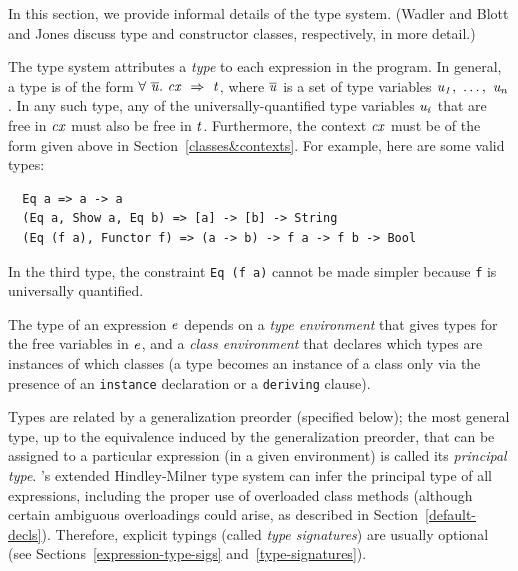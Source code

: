 In this section, we provide informal details of the type system.
(Wadler and Blott \cite{wadler:classes} and Jones
\cite{jones:cclasses} discuss type
and constructor classes, respectively, in more detail.)


The \Haskell{} type system attributes a {\em type} to each
expression in the program.  In general, a type is of the form
\mbox{$\it \forall\ \overline{u}.~cx\ \Rightarrow\ t$},
where \mbox{$\it \overline{u}$} is a set of type variables \mbox{$\it u_1,\ \ldots ,\ u_n$}.
In any such type, any of the universally-quantified type variables \mbox{$\it u_i$}
that are free in \mbox{$\it cx$} must also be free in \mbox{$\it t$}.
Furthermore, the context \mbox{$\it cx$} must be of the form given above in
Section~\ref{classes&contexts}.  For example, here are some
valid types:
\bprog
{\small\begin{verbatim}
  Eq a => a -> a
  (Eq a, Show a, Eq b) => [a] -> [b] -> String
  (Eq (f a), Functor f) => (a -> b) -> f a -> f b -> Bool
\end{verbatim}}
\eprog
In the third type, the constraint \mbox{\tt Eq\ (f\ a)} cannot be made
simpler because \mbox{\tt f} is universally quantified.

The type of an expression \mbox{$\it e$} depends 
on a {\em type environment} that gives types 
for the free variables in \mbox{$\it e$}, and a
{\em class environment} that 
declares which types are instances of which classes (a type becomes
an instance of a class only via the presence of an
\mbox{\tt instance} declaration or a \mbox{\tt deriving} clause).

Types are related by a generalization preorder
(specified below);
the most general type, up to the equivalence induced by the generalization preorder,
that can be assigned to a particular
expression (in a given environment) is called its {\em
principal type}.
\Haskell{}'s extended Hindley-Milner type system can infer the principal
type of all expressions, including the proper use of overloaded
class methods (although certain ambiguous overloadings could arise, as
described in Section~\ref{default-decls}).  Therefore, explicit typings (called
{\em type signatures})
are usually optional (see
Sections~\ref{expression-type-sigs} and~\ref{type-signatures}).

